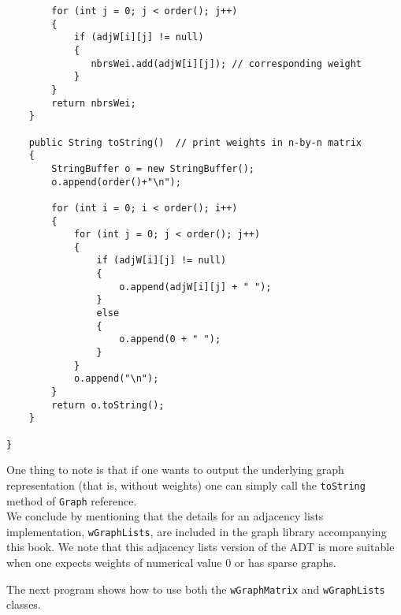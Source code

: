 {\begin{verbatim}
        for (int j = 0; j < order(); j++)
        {
            if (adjW[i][j] != null)
            {
               nbrsWei.add(adjW[i][j]); // corresponding weight
            }
        }
        return nbrsWei;
    }

    public String toString()  // print weights in n-by-n matrix 
    {
        StringBuffer o = new StringBuffer();
        o.append(order()+"\n");

        for (int i = 0; i < order(); i++)
        {
            for (int j = 0; j < order(); j++)
            {
                if (adjW[i][j] != null)
                {
                    o.append(adjW[i][j] + " ");
                }
                else
                {
                    o.append(0 + " ");
                }
            }
            o.append("\n");
        }
        return o.toString();
    }
 
}
\end{verbatim}%
}

One thing to note is that if one wants to output the underlying graph 
representation (that is, without weights) one can simply call 
the \verb|toString| method of \verb|Graph| reference.  \\

We conclude by mentioning that the details for an adjacency lists
implementation, \verb|wGraphLists|, are included in the graph library
accompanying this book.  We note that this adjacency lists version of the
ADT is more suitable when one expects weights of numerical value 0 or
has sparse graphs.

The next program shows how to use both the \verb|wGraphMatrix|
and \verb|wGraphLists| classes.

